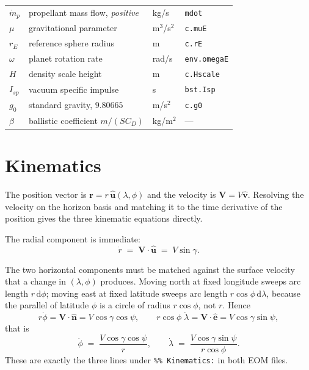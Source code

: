 \documentclass[11pt]{article}
\newcommand{\vhat}{\hat{\mathbf{v}}}
\newcommand{\nhat}{\hat{\mathbf{n}}}
\newcommand{\ehat}{\hat{\mathbf{e}}}
\newcommand{\uhat}{\hat{\mathbf{u}}}
\newcommand{\code}[1]{\texttt{#1}}
\newcommand{\dd}{\mathrm{d}}
\begin{document}
\begin{center}
\begin{tabular}{llll}
$\dot m_p$ & propellant mass flow, \emph{positive}    & kg/s      & \code{mdot} \\
$\mu$      & gravitational parameter                  & m$^3$/s$^2$ & \code{c.muE} \\
$r_E$      & reference sphere radius                  & m         & \code{c.rE} \\
$\omega$   & planet rotation rate                     & rad/s     & \code{env.omegaE} \\
$H$        & density scale height                     & m         & \code{c.Hscale} \\
$I_{sp}$   & vacuum specific impulse                  & s         & \code{bst.Isp} \\
$g_0$      & standard gravity, $9.80665$              & m/s$^2$   & \code{c.g0} \\
$\beta$    & ballistic coefficient $m/(SC_D)$         & kg/m$^2$  & --- \\
\bottomrule
\end{tabular}
\end{center}

\section{Kinematics}
\label{sec:kinematics}

The position vector is $\mathbf{r} = r\,\uhat(\lambda,\phi)$ and the velocity
is $\mathbf{V}=V\vhat$. Resolving the velocity on the horizon basis and
matching it to the time derivative of the position gives the three kinematic
equations directly.

The radial component is immediate:
\begin{equation}
  \dot r \;=\; \mathbf{V}\cdot\uhat \;=\; V\sin\gamma .
  \label{eq:rdot}
\end{equation}

The two horizontal components must be matched against the surface velocity that
a change in $(\lambda,\phi)$ produces. Moving north at fixed longitude sweeps
arc length $r\,\dd\phi$; moving east at fixed latitude sweeps arc length
$r\cos\phi\,\dd\lambda$, because the parallel of latitude $\phi$ is a circle of
radius $r\cos\phi$, not $r$. Hence
\begin{equation}
  r\dot\phi = \mathbf{V}\cdot\nhat = V\cos\gamma\cos\psi ,
  \qquad
  r\cos\phi\;\dot\lambda = \mathbf{V}\cdot\ehat = V\cos\gamma\sin\psi ,
\end{equation}
that is
\begin{equation}
  \dot\phi \;=\; \frac{V\cos\gamma\cos\psi}{r},
  \qquad
  \dot\lambda \;=\; \frac{V\cos\gamma\sin\psi}{r\cos\phi} .
  \label{eq:latlondot}
\end{equation}
These are exactly the three lines under \code{\%\% Kinematics:} in both EOM
files.
\end{document}
